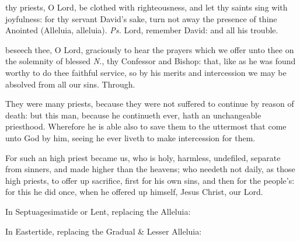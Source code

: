 \introit
{} thy priests, O Lord, be clothed with righteousness, and let thy saints sing with joyfulness: for thy servant David's sake, turn not away the presence of thine Anointed (Alleluia, alleluia). \textit{Ps.} Lord, remember David: and all his trouble.

\collect\label{CommonConfessorBishopIICollect}
 beseech thee, O Lord, graciously to hear the prayers which we offer unto thee on the solemnity of blessed \textit{N.}, thy Confessor and Bishop: that, like as he was found worthy to do thee faithful service, so by his merits and intercession we may be absolved from all our sins. Through.

\label{CommonConfessorBishopIIEpistle}
 They were many priests, because they were not suffered to continue by reason of death: but this man, because he continueth ever, hath an unchangeable priesthood. Wherefore he is able also to save them to the uttermost that come unto God by him, seeing he ever liveth to make intercession for them.

For such an high priest became us, who is holy, harmless, undefiled, separate from sinners, and made higher than the heavens; who needeth not daily, as those high priests, to offer up sacrifice, first for his own sins, and then for the people’s: for this he did once, when he offered up himself, Jesus Christ, our Lord.


\clearpage
\begin{rubric}
{In Septuagesimatide or Lent, replacing the Alleluia:}
\end{rubric}

\vspace{-1ex}


\begin{rubric}
{In Eastertide, replacing the Gradual \& Lesser Alleluia:}
\end{rubric}

